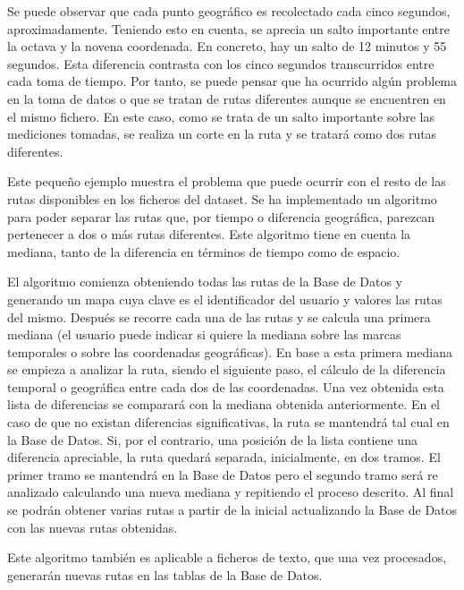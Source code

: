 Se puede observar que cada punto geográfico es recolectado cada cinco segundos, aproximadamente. Teniendo esto en cuenta, se aprecia un salto importante entre la octava y la novena coordenada. En concreto, hay un salto de 12 minutos y 55 segundos. Esta diferencia contrasta con los cinco segundos transcurridos entre cada toma de tiempo. Por tanto, se puede pensar que ha ocurrido algún problema en la toma de datos o que se tratan de rutas diferentes aunque se encuentren en el mismo fichero. En este caso, como se trata de un salto importante sobre las mediciones tomadas, se realiza un corte en la ruta y se tratará como dos rutas diferentes.

Este pequeño ejemplo muestra el problema que puede ocurrir con el resto de las rutas disponibles en los ficheros del dataset. Se ha implementado un algoritmo para poder separar las rutas que, por tiempo o diferencia geográfica, parezcan pertenecer a dos o más rutas diferentes. Este algoritmo tiene en cuenta la mediana, tanto de la diferencia en términos de tiempo como de espacio.


El algoritmo comienza obteniendo todas las rutas de la Base de Datos y generando un mapa cuya clave es el identificador del usuario y valores las rutas del mismo. Después se recorre cada una de las rutas y se calcula una primera mediana (el usuario puede indicar si quiere la mediana sobre las marcas temporales o sobre las coordenadas geográficas). En base a esta primera mediana se empieza a analizar la ruta, siendo el siguiente paso, el cálculo de la diferencia temporal o geográfica entre cada dos de las coordenadas. Una vez obtenida esta lista de diferencias se comparará con la mediana obtenida anteriormente. En el caso de que no existan diferencias significativas, la ruta se mantendrá tal cual en la Base de Datos. Si, por el contrario, una posición de la lista contiene una diferencia apreciable, la ruta quedará separada, inicialmente, en dos tramos. El primer tramo se mantendrá en la Base de Datos pero el segundo tramo será re analizado calculando una nueva mediana y repitiendo el proceso descrito. Al final se podrán obtener varias rutas a partir de la inicial actualizando la Base de Datos con las nuevas rutas obtenidas.

Este algoritmo también es aplicable a ficheros de texto, que una vez procesados, generarán nuevas rutas en las tablas de la Base de Datos.